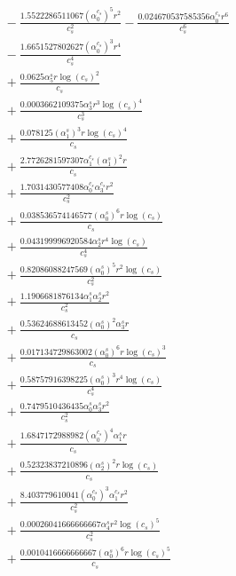 \documentclass[10pt]{article}
\begin{document}
\begin{align*}
&{}  - \frac{1.5522286511067 \left(\alpha_{0}^{c_s}\right)^{5} r^{2}}{c_{s}^{2}} - \frac{0.024670537585356 \alpha_{0}^{c_s} r^{6}}{c_{s}^{6}} \\
&{}  - \frac{1.6651527802627 \left(\alpha_{0}^{c_s}\right)^{3} r^{4}}{c_{s}^{4}} \\
&{}  + \frac{0.0625 \alpha_{5}^s r \log{\left(c_{s} \right)}^{2}}{c_{s}} \\
&{}  + \frac{0.0003662109375 \alpha_{3}^s r^{3} \log{\left(c_{s} \right)}^{4}}{c_{s}^{3}} \\
&{}  + \frac{0.078125 \left(\alpha_{1}^s\right)^{3} r \log{\left(c_{s} \right)}^{4}}{c_{s}} \\
&{}  + \frac{2.7726281597307 \alpha_{1}^{c_s} \left(\alpha_{1}^s\right)^{2} r}{c_{s}} \\
&{}  + \frac{1.7031430577408 \alpha_{0}^{c_s} \alpha_{3}^{c_s} r^{2}}{c_{s}^{2}} \\
&{}  + \frac{0.038536574146577 \left(\alpha_{0}^s\right)^{6} r \log{\left(c_{s} \right)}}{c_{s}} \\
&{}  + \frac{0.043199996920584 \alpha_{2}^s r^{4} \log{\left(c_{s} \right)}}{c_{s}^{4}} \\
&{}  + \frac{0.82086088247569 \left(\alpha_{0}^s\right)^{5} r^{2} \log{\left(c_{s} \right)}}{c_{s}^{2}} \\
&{}  + \frac{1.1906681876134 \alpha_{1}^s \alpha_{2}^s r^{2}}{c_{s}^{2}} \\
&{}  + \frac{0.53624688613452 \left(\alpha_{0}^s\right)^{2} \alpha_{3}^s r}{c_{s}} \\
&{}  + \frac{0.017134729863002 \left(\alpha_{0}^s\right)^{6} r \log{\left(c_{s} \right)}^{3}}{c_{s}} \\
&{}  + \frac{0.58757916398225 \left(\alpha_{0}^s\right)^{3} r^{4} \log{\left(c_{s} \right)}}{c_{s}^{4}} \\
&{}  + \frac{0.7479510436435 \alpha_{0}^s \alpha_{3}^s r^{2}}{c_{s}^{2}} \\
&{}  + \frac{1.6847172988982 \left(\alpha_{0}^{c_s}\right)^{4} \alpha_{1}^s r}{c_{s}} \\
&{}  + \frac{0.52323837210896 \left(\alpha_{2}^s\right)^{2} r \log{\left(c_{s} \right)}}{c_{s}} \\
&{}  + \frac{8.403779610041 \left(\alpha_{0}^{c_s}\right)^{3} \alpha_{1}^{c_s} r^{2}}{c_{s}^{2}} \\
&{}  + \frac{0.00026041666666667 \alpha_{4}^s r^{2} \log{\left(c_{s} \right)}^{5}}{c_{s}^{2}} \\
&{}  + \frac{0.0010416666666667 \left(\alpha_{0}^s\right)^{6} r \log{\left(c_{s} \right)}^{5}}{c_{s}} \\

\end{align*}
\end{document}
